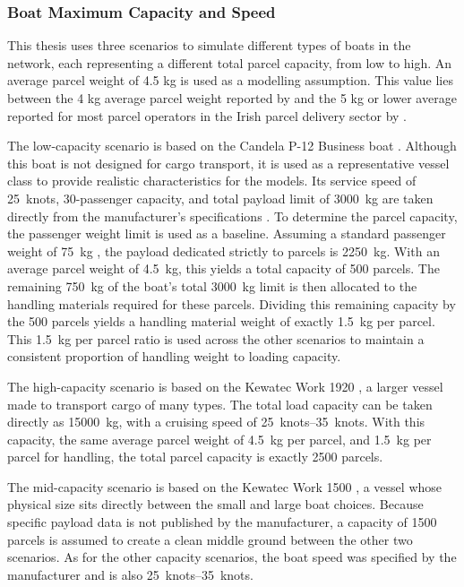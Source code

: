 \documentclass[12pt]{article}
\begin{document}
\subsubsection{Boat Maximum Capacity and Speed}
\label{subsubsec:boat-maximum-capacity-speed}

This thesis uses three scenarios to simulate different types of boats in the network, each representing a different total parcel capacity, from low to high. An average parcel weight of 4.5 kg is used as a modelling assumption. This value lies between the 4 kg average parcel weight reported by \textcite{stalhammar1996rating} and the 5 kg or lower average reported for most parcel operators in the Irish parcel delivery sector by \textcite{frontier2021ecommerce}.

The low-capacity scenario is based on the Candela P-12 Business boat \parencite{candela2026p12}. Although this boat is not designed for cargo transport, it is used as a representative vessel class to provide realistic characteristics for the models. Its service speed of \qty{25}{knots}, \num{30}-passenger capacity, and total payload limit of \qty{3000}{\kilogram} are taken directly from the manufacturer's specifications \parencite{candela2026p12}. To determine the parcel capacity, the passenger weight limit is used as a baseline. Assuming a standard passenger weight of \qty{75}{\kilogram} \parencite{passengerkg}, the payload dedicated strictly to parcels is \qty{2250}{\kilogram}. With an average parcel weight of \qty{4.5}{\kilogram}, this yields a total capacity of \num{500} parcels. The remaining \qty{750}{\kilogram} of the boat's total \qty{3000}{\kilogram} limit is then allocated to the handling materials required for these parcels. Dividing this remaining capacity by the \num{500} parcels yields a handling material weight of exactly \qty{1.5}{\kilogram} per parcel. This \qty{1.5}{\kilogram} per parcel ratio is used across the other scenarios to maintain a consistent proportion of handling weight to loading capacity.

The high-capacity scenario is based on the Kewatec Work 1920 \parencite{kewatec_work_1920}, a larger vessel made to transport cargo of many types. The total load capacity can be taken directly as \qty{15000}{\kilogram}, with a cruising speed of \qtyrange{25}{35}{knots}. With this capacity, the same average parcel weight of \qty{4.5}{\kilogram} per parcel, and \qty{1.5}{\kilogram} per parcel for handling, the total parcel capacity is exactly \num{2500} parcels.

The mid-capacity scenario is based on the Kewatec Work 1500 \parencite{kewatec_work_1500}, a vessel whose physical size sits directly between the small and large boat choices. Because specific payload data is not published by the manufacturer, a capacity of \num{1500} parcels is assumed to create a clean middle ground between the other two scenarios. As for the other capacity scenarios, the boat speed was specified by the manufacturer and is also \qtyrange{25}{35}{knots}.
\end{document}
